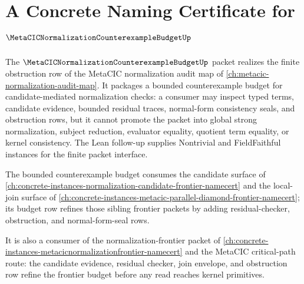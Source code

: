 \chapter{A Concrete Naming Certificate for $\MetaCICNormalizationCounterexampleBudgetUp$}
\label{ch:concrete-instances-metacic-normalization-counterexample-budget-namecert}

The $\MetaCICNormalizationCounterexampleBudgetUp$ packet realizes the finite obstruction row of the MetaCIC normalization audit map of \autoref{ch:metacic-normalization-audit-map}. It packages a bounded counterexample budget for candidate-mediated normalization checks: a consumer may inspect typed terms, candidate evidence, bounded residual traces, normal-form consistency seals, and obstruction rows, but it cannot promote the packet into global strong normalization, subject reduction, evaluator equality, quotient term equality, or kernel consistency. The Lean follow-up supplies Nontrivial and FieldFaithful instances for the finite packet interface.

The bounded counterexample budget consumes the candidate surface of \autoref{ch:concrete-instances-normalization-candidate-frontier-namecert} and the local-join surface of \autoref{ch:concrete-instances-metacic-parallel-diamond-frontier-namecert}; its budget row refines those sibling frontier packets by adding residual-checker, obstruction, and normal-form-seal rows.

It is also a consumer of the normalization-frontier packet of \autoref{ch:concrete-instances-metacicnormalizationfrontier-namecert} and the MetaCIC critical-path route: the candidate evidence, residual checker, join envelope, and obstruction row refine the frontier budget before any read reaches kernel primitives.


